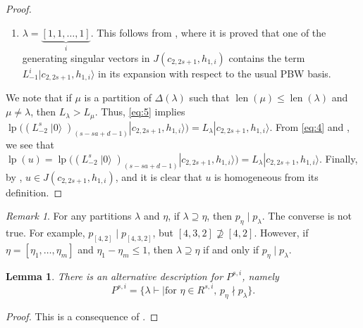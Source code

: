 \documentclass[a4paper, 12pt, reqno]{amsart}
\newtheorem{lemma}[theorem]{Lemma}
\theoremstyle{remark}
\newtheorem{remark}[theorem]{Remark}
\DeclareMathOperator{\len}{len}
\DeclareMathOperator{\vac}{|0\rangle}
\DeclareMathOperator{\lp}{lp}
\begin{document}
\begin{proof}
\begin{enumerate}
\begin{description}[leftmargin = !]
      Since $\binom{s - 1}{d - 1} + \binom{s - 1}{d} = \binom{s}{d}$, we obtain \eqref{eq:5}.
    \end{description}
  \item $\lambda = \underbrace{[1, 1, \dots, 1]}_i$.
    This follows from \cite{benoit_degenerate_1988}, where it is proved that one of the generating singular vectors in $J(c_{2, 2s + 1}, h_{1, i})$ contains the term $L_{-1}^i|c_{2, 2s + 1}, h_{1, i}\rangle$ in its expansion with respect to the usual PBW basis.
  \end{enumerate}
  We note that if $\mu$ is a partition of $\Delta(\lambda)$ such that $\len(\mu) \le \len(\lambda)$ and $\mu \neq \lambda$, then $L_{\lambda} > L_{\mu}$.
  Thus, \eqref{eq:5} implies $\lp((L_{-2}^s\vac)_{(s - sa + d - 1)}|c_{2, 2s + 1}, h_{1, i}\rangle) = L_{\lambda}|c_{2, 2s + 1}, h_{1, i}\rangle$.
  From \eqref{eq:4} and , we see that $\lp(u) = \lp((L_{-2}^s\vac)_{(s - sa + d - 1)}|c_{2, 2s + 1}, h_{1, i}\rangle) = L_{\lambda}|c_{2, 2s + 1}, h_{1, i}\rangle$.
  Finally, by , $u \in J(c_{2, 2s + 1}, h_{1, i})$, and it is clear that $u$ is homogeneous from its definition.
\end{proof}

\begin{remark}
  \label{rmk:5}
  For any partitions $\lambda$ and $\eta$, if $\lambda \supseteq \eta$, then $p_{\eta} \mid p_{\lambda}$.
  The converse is not true.
  For example, $p_{[4, 2]} \mid p_{[4, 3, 2]}$, but $[4, 3, 2] \nsupseteq [4, 2]$.
  However, if $\eta = [\eta_1, \dots, \eta_m]$ and $\eta_1 - \eta_m \le 1$, then $\lambda \supseteq \eta$ if and only if $p_{\eta} \mid p_{\lambda}$.
\end{remark}

\begin{lemma}
  \label{lmm:11}
  There is an alternative description for $P^{s, i}$, namely
  \begin{equation*}
    P^{s, i} = \{\lambda \vdash \mid \text{for $\eta \in R^{s, i}$, $p_{\eta} \nmid p_{\lambda}$}\}.
  \end{equation*}
\end{lemma}

\begin{proof}
  This is a consequence of .
\end{proof}
\end{document}
